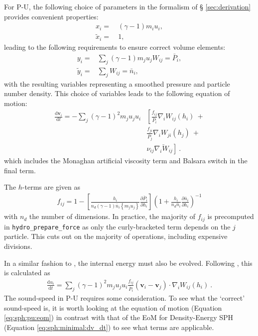 For P-U, the following choice of parameters in the formalism of \S
\ref{sec:derivation} provides convenient properties:
\begin{align}
  x_i =&~ (\gamma - 1) m_i u_i, \\
  \tilde{x}_i =&~ 1,
  \label{eq:sph:pu:xichoice}
\end{align}
leading to the following requirements to ensure correct volume elements:
\begin{align}
  y_i =& \sum_{j} (\gamma - 1) m_j u_j W_{ij} = \bar{P}_i,\\
  \tilde{y}_i =& \sum_{j} W_{ij} = \bar{n}_i,
  \label{eq:sph:pu:yichoice}
\end{align}
with the resulting variables representing a smoothed pressure and particle
number density. This choice of variables leads to the following equation of
motion:
\begin{align}
  \frac{\mathrm{d} \mathbf{v}_i}{\mathrm{d} t} = -\sum_j (\gamma - 1)^2 m_j u_j u_i
	 &\left[\frac{f_{ij}}{\bar{P}_i} \nabla_i W_{ij}(h_i) ~+ \right. \nonumber \\
	       &\frac{f_{ji}}{\bar{P}_j} \nabla_i W_{ji}(h_j) ~+ \nonumber \\
	       & \left.\nu_{ij}\bar{\nabla_i W_{ij}}\right]~.
  \label{eq:sph:pu:eom}
\end{align}
which includes the Monaghan artificial viscosity term and Balsara switch in
the final term.

The $h$-terms are given as
\begin{align}
  f_{ij} = 1 - \left[\frac{h_i}{n_d (\gamma - 1) \bar{n}_i \left\{m_j u_j\right\}}
		   \frac{\partial \bar{P}_i}{\partial h_i} \right]
		   \left( 1 + \frac{h_i}{n_d \bar{n}_i}
		   \frac{\partial \bar{n}_i}{\partial h_i} \right)^{-1}
  \label{eq:sph:pu:fij}
\end{align}
with $n_d$ the number of dimensions. In practice, the majority of $f_{ij}$ is
precomputed in {\tt hydro\_prepare\_force} as only the curly-bracketed term
depends on the $j$ particle. This cuts out on the majority of operations,
including expensive divisions.

In a similar fashion to \MinimalSPH, the internal energy must also be
evolved. Following \cite{Hopkins2013}, this is calculated as
\begin{align}
  \frac{\mathrm{d}u_i}{\mathrm{d}t} = \sum_j (\gamma - 1)^2 m_j u_j u_i
	\frac{f_{ij}}{\bar{P}_i}(\mathbf{v}_i - \mathbf{v}_j) \cdot
	\nabla_i W_{ij}(h_i)~.
  \label{eq:sph:pu:dudt}
\end{align}
The sound-speed in P-U requires some consideration. To see what the `correct' sound-speed
is, it is worth looking at the equation of motion (Equation \ref{eq:sph:pu:eom}) in
contrast with that of the EoM for Density-Energy SPH (Equation \ref{eq:sph:minimal:dv_dt})
to see what terms are applicable.

